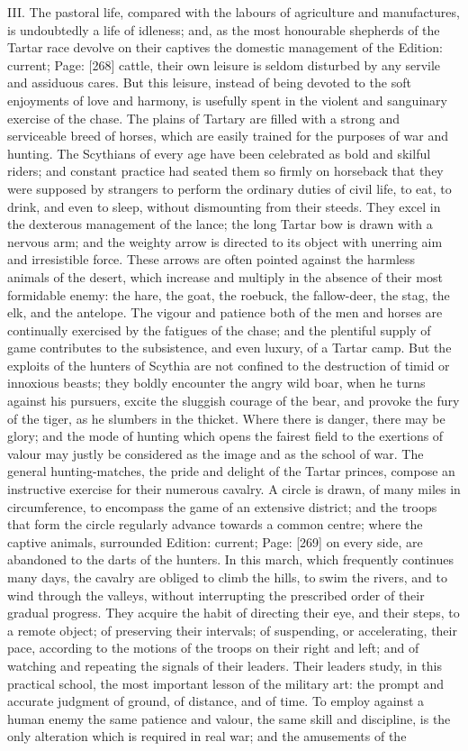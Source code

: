 III. The pastoral life, compared with the labours of agriculture and manufactures, is undoubtedly a life of idleness; and, as the most honourable shepherds of the Tartar race devolve on their captives the domestic management of the Edition: current; Page: [268] cattle, their own leisure is seldom disturbed by any servile and assiduous cares. But this leisure, instead of being devoted to the soft enjoyments of love and harmony, is usefully spent in the violent and sanguinary exercise of the chase. The plains of Tartary are filled with a strong and serviceable breed of horses, which are easily trained for the purposes of war and hunting. The Scythians of every age have been celebrated as bold and skilful riders; and constant practice had seated them so firmly on horseback that they were supposed by strangers to perform the ordinary duties of civil life, to eat, to drink, and even to sleep, without dismounting from their steeds. They excel in the dexterous management of the lance; the long Tartar bow is drawn with a nervous arm; and the weighty arrow is directed to its object with unerring aim and irresistible force. These arrows are often pointed against the harmless animals of the desert, which increase and multiply in the absence of their most formidable enemy: the hare, the goat, the roebuck, the fallow-deer, the stag, the elk, and the antelope. The vigour and patience both of the men and horses are continually exercised by the fatigues of the chase; and the plentiful supply of game contributes to the subsistence, and even luxury, of a Tartar camp. But the exploits of the hunters of Scythia are not confined to the destruction of timid or innoxious beasts; they boldly encounter the angry wild boar, when he turns against his pursuers, excite the sluggish courage of the bear, and provoke the fury of the tiger, as he slumbers in the thicket. Where there is danger, there may be glory; and the mode of hunting which opens the fairest field to the exertions of valour may justly be considered as the image and as the school of war. The general hunting-matches, the pride and delight of the Tartar princes, compose an instructive exercise for their numerous cavalry. A circle is drawn, of many miles in circumference, to encompass the game of an extensive district; and the troops that form the circle regularly advance towards a common centre; where the captive animals, surrounded Edition: current; Page: [269] on every side, are abandoned to the darts of the hunters. In this march, which frequently continues many days, the cavalry are obliged to climb the hills, to swim the rivers, and to wind through the valleys, without interrupting the prescribed order of their gradual progress. They acquire the habit of directing their eye, and their steps, to a remote object; of preserving their intervals; of suspending, or accelerating, their pace, according to the motions of the troops on their right and left; and of watching and repeating the signals of their leaders. Their leaders study, in this practical school, the most important lesson of the military art: the prompt and accurate judgment of ground, of distance, and of time. To employ against a human enemy the same patience and valour, the same skill and discipline, is the only alteration which is required in real war; and the amusements of the 